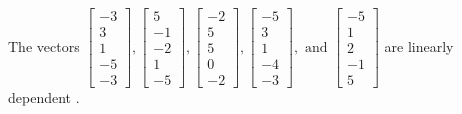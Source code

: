 \begin{exercise}
\begin{exerciseStatement}
  \end{exerciseStatement}
  \begin{exerciseAnswer}
   The vectors \(\left[\begin{array}{r}
-3 \\
3 \\
1 \\
-5 \\
-3
\end{array}\right] , \left[\begin{array}{r}
5 \\
-1 \\
-2 \\
1 \\
-5
\end{array}\right] , \left[\begin{array}{r}
-2 \\
5 \\
5 \\
0 \\
-2
\end{array}\right] , \left[\begin{array}{r}
-5 \\
3 \\
1 \\
-4 \\
-3
\end{array}\right] , \text{ and } \left[\begin{array}{r}
-5 \\
1 \\
2 \\
-1 \\
5
\end{array}\right]\) are 
  	 linearly dependent  .
  


  \end{exerciseAnswer}
\end{exercise}